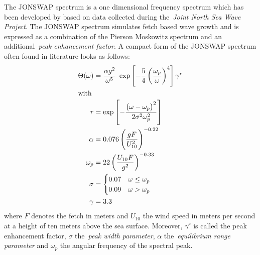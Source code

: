 %
The JONSWAP spectrum is a one dimensional frequency spectrum  which has been 
developed by \citet{article:Hasselman1973} based on data 
collected during the~\emph{Joint North Sea Wave Project}. The JONSWAP spectrum 
simulates fetch based wave growth and is expressed as a combination of the 
Pierson Moskowitz spectrum and an additional~\emph{peak enhancement factor}. A 
compact form of the JONSWAP spectrum often found in literature looks as follows:
%
\begin{subequations}
\label{eq:jonswap_omega}
\begin{align}
 \Theta(\omega) &= \frac{\alpha
g^2}{\omega^5}~\exp\left[-\frac{5}{4}\left(\frac{\omega_p}{\omega}
\right)^4\right]\gamma^r\\
\intertext{with}
r& = \exp\left[-\frac{\left(\omega -
\omega_p\right)^2}{2\sigma^2\omega_p^2}\right] \\
\alpha &= 0.076\left(\frac{gF}{U_{10}^2}\right)^{-0.22} \\
\omega_{p} &= 22\left(\frac{U_{10}F}{g^2}\right)^{-0.33} \\
\sigma &= \begin{cases}
	0.07 & \omega\leq\omega_p\\
	0.09 & \omega > \omega_p
    \end{cases} \\
\gamma &= 3.3
\end{align}
\end{subequations}
where $F$ denotes the fetch in meters and $U_{10}$ the wind speed in meters per 
second at a height of ten meters above the sea surface. Moreover, $\gamma^r$ is 
called the peak enhancement factor, $\sigma$ the~\emph{peak width parameter}, 
$\alpha$ the~\emph{equilibrium range parameter} and $\omega_p$ the angular 
frequency of the spectral peak.
%
